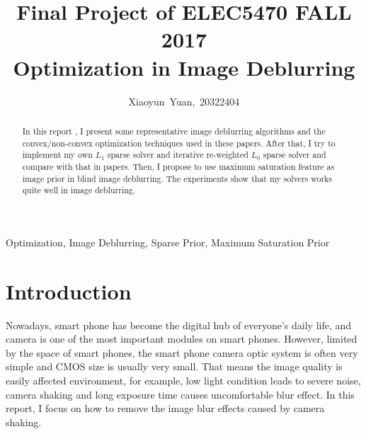 \documentclass[journal, onecolumn, 10pt]{IEEEtran}
\begin{document}
\title{Final Project of ELEC5470 FALL 2017 \\ Optimization in Image Deblurring }

\author{Xiaoyun~Yuan,~20322404}


%
{}
\maketitle

\begin{abstract}
In this report , I present some representative image deblurring algorithms and the convex/non-convex optimization techniques used in these papers. After that, I try to implement my own $L_1$ sparse solver and iterative re-weighted $L_0$ sparse solver and compare with that in papers. Then, I propose to use maximum saturation feature as image prior in blind image deblurring. The experiments show that my solvers works quite well in image deblurring.
\end{abstract}

\begin{IEEEkeywords}
Optimization, Image Deblurring, Sparse Prior, Maximum Saturation Prior 
\end{IEEEkeywords}

\IEEEpeerreviewmaketitle

\section{Introduction}
\label{sec:introduction}
Nowadays, smart phone has become the digital hub of everyone's daily life, and camera is one of the most important modules on smart phones. However, limited by the space of smart phones, the smart phone camera optic system is often very simple and CMOS size is usually very small. That means the image quality is easily affected environment, for example, low light condition leads to severe noise, camera shaking and long exposure time causes uncomfortable blur effect. In this report, I focus on how to remove the image blur effects caused by camera shaking.
\end{document}

